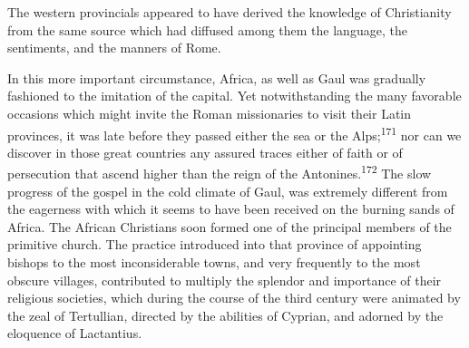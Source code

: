 



The western provincials appeared to have derived the knowledge of
Christianity from the same source which had diffused among them
the language, the sentiments, and the manners of Rome.

In this more important circumstance, Africa, as well as Gaul was
gradually fashioned to the imitation of the capital. Yet
notwithstanding the many favorable occasions which might invite
the Roman missionaries to visit their Latin provinces, it was
late before they passed either the sea or the Alps;\textsuperscript{171} nor can
we discover in those great countries any assured traces either of
faith or of persecution that ascend higher than the reign of the
Antonines.\textsuperscript{172} The slow progress of the gospel in the cold
climate of Gaul, was extremely different from the eagerness with
which it seems to have been received on the burning sands of
Africa. The African Christians soon formed one of the principal
members of the primitive church. The practice introduced into
that province of appointing bishops to the most inconsiderable
towns, and very frequently to the most obscure villages,
contributed to multiply the splendor and importance of their
religious societies, which during the course of the third century
were animated by the zeal of Tertullian, directed by the
abilities of Cyprian, and adorned by the eloquence of Lactantius.

